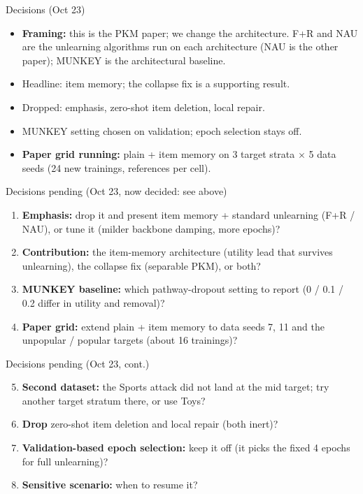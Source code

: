 \documentclass{beamer}
\begin{document}
\begin{frame}{Decisions (Oct 23)}
\begin{itemize}
  \item \textbf{Framing:} this is the PKM paper; we change the architecture. F+R
        and NAU are the unlearning algorithms run on each architecture (NAU is
        the other paper); MUNKEY is the architectural baseline.
  \item Headline: item memory; the collapse fix is a supporting result.
  \item Dropped: emphasis, zero-shot item deletion, local repair.
  \item MUNKEY setting chosen on validation; epoch selection stays off.
  \item \textbf{Paper grid running:} plain + item memory on 3 target strata
        $\times$ 5 data seeds (24 new trainings, references per cell).
\end{itemize}
\end{frame}

\begin{frame}{Decisions pending (Oct 23, now decided: see above)}
\begin{enumerate}
  \item \textbf{Emphasis:} drop it and present item memory + standard
        unlearning (F+R / NAU), or tune it (milder backbone damping, more epochs)?
  \item \textbf{Contribution:} the item-memory architecture (utility lead that
        survives unlearning), the collapse fix (separable PKM), or both?
  \item \textbf{MUNKEY baseline:} which pathway-dropout setting to report
        (0 / 0.1 / 0.2 differ in utility and removal)?
  \item \textbf{Paper grid:} extend plain + item memory to data seeds 7, 11
        and the unpopular / popular targets (about 16 trainings)?
\end{enumerate}
\end{frame}

\begin{frame}{Decisions pending (Oct 23, cont.)}
\begin{enumerate}
  \setcounter{enumi}{4}
  \item \textbf{Second dataset:} the Sports attack did not land at the mid
        target; try another target stratum there, or use Toys?
  \item \textbf{Drop} zero-shot item deletion and local repair (both inert)?
  \item \textbf{Validation-based epoch selection:} keep it off (it picks the
        fixed 4 epochs for full unlearning)?
  \item \textbf{Sensitive scenario:} when to resume it?
\end{enumerate}
\end{frame}
\end{document}
